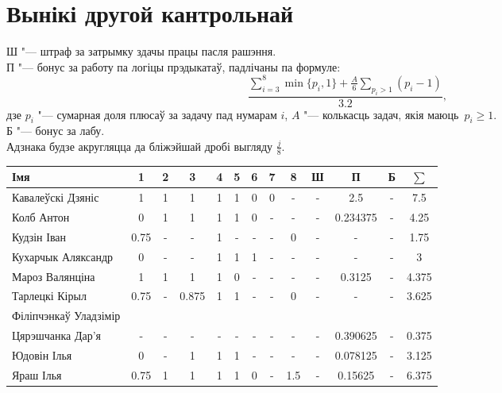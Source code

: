 

\geometry{left=1.5cm}


	\section{Вынікі другой кантрольнай}
	\noindent Ш "--- штраф за затрымку здачы працы пасля рашэння. \\
    П "--- бонус за работу па логіцы прэдыкатаў, падлічаны па формуле:
    $$\dfrac{\sum \limits _{i=3} ^8 \min\{p_i, 1\} + \frac{A}{6} \sum \limits _{p_i > 1} (p_i - 1)}{3.2},$$
    дзе $p_i$ "--- сумарная доля плюсаў за задачу пад нумарам $i$, $A$ "--- колькасць задач, якія маюць~$p_i \geqslant 1$. \\
    Б "--- бонус за лабу. \\
    Адзнака будзе акругляцца да бліжэйшай дробі выгляду $\frac{j}{8}$.
\begin{table}[H]
	\begin{tabular}{|l|c|c|c|c|c|c|c|c|c|c|c|c|}
		\hline
		Імя                   &  1   &  2   &   3   & 4 & 5 &  6   &  7   &   8   & Ш &   П    &   Б   & $\sum$ \\ \hline
		Кавалеўскі Дзяніс     & 1    &  1   & 1 & 1 & 1 & 0    & 0  &  -    & - & 2.5 & - &   7.5  \\ \hline
		Колб Антон            &  0   & 1    & 1 & 1 & 1 &  0   & - & -     & - & 0.234375 &  -    & 4.25  \\ \hline
		Кудзін Іван           &   0.75  & -    & -  & 1 & - & -    & -    & 0     & -  &  -  &  -    & 1.75  \\ \hline
		Кухарчык Аляксандр    & 0 &  -   & - & 1 & 1 &  1   &  -   &  -    & - &   -    & -  & 3  \\ \hline
		Мароз Валянціна       &  1   &  1   &   1   & 1 & 0 &  -   &  -   &  -  & - & 0.3125      &   -   &   4.375    \\ \hline
		Тарлецкі Кірыл        & 0.75    & -    & 0.875     & 1 & 1 & -    & -    & 0     & - & - &  -    &   3.625    \\ \hline
		Філіпчэнкаў Уладзімір &     &     &      &  &  &     &     &      &  &  &      &      \\ \hline
		Цярэшчанка Дар'я      &  -   & - & - & - & - & -    & - &  -    & - & 0.390625   &  -    & 0.375  \\ \hline
		Юдовін Ілья           &  0   &  -   & 1 & 1 & 1 & -    & -  &  -    & -  &  0.078125     &  -    &  3.125 \\ \hline
		Яраш Ілья             &  0.75   &  1   & 1 & 1 & 1 & 0 & - & 1.5 & - &  0.15625  &  -    &  6.375  \\ \hline
	\end{tabular}
\end{table}


